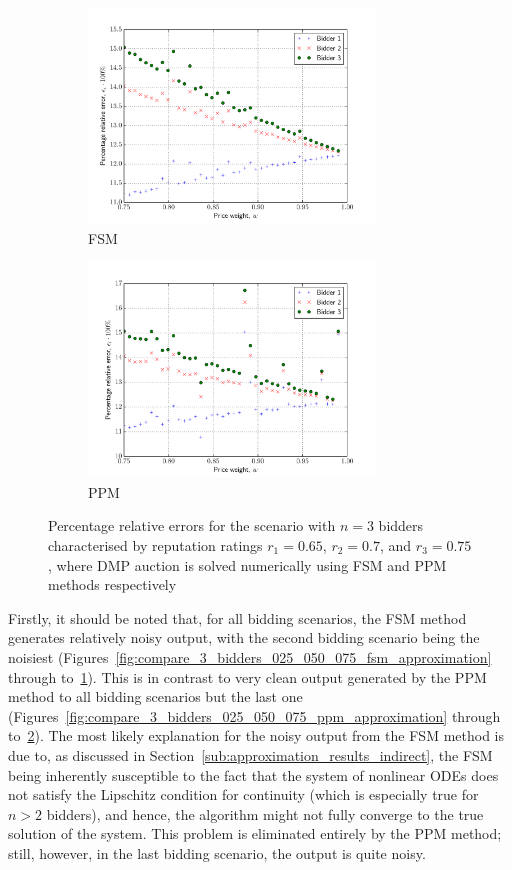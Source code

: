 \begin{figure}[p!]
  \begin{subfigure}[b]{0.5\textwidth}
    \includegraphics[width=3in]{Approximation/Figures/compare_3_bidders_065_070_075}
    \caption{FSM}
    \label{fig:compare_3_bidders_065_070_075_fsm_approximation}
  \end{subfigure}
  \begin{subfigure}[b]{0.5\textwidth}
    \includegraphics[width=3in]{Approximation/Figures/compare_3_bidders_065_070_075_ppm}
    \caption{PPM}
    \label{fig:compare_3_bidders_065_070_075_ppm_approximation}
  \end{subfigure}
  \caption{Percentage relative errors for the scenario with $n=3$ bidders characterised by reputation ratings $r_1=0.65$, $r_2=0.7$, and $r_3=0.75$, where DMP auction is solved numerically using FSM and PPM methods respectively}
  \label{fig:compare_3_bidders_065_070_075_approximation}
\end{figure}

Firstly, it should be noted that, for all bidding scenarios, the FSM method generates relatively noisy output, with the second bidding scenario being the noisiest (Figures~\ref{fig:compare_3_bidders_025_050_075_fsm_approximation} through to~\ref{fig:compare_3_bidders_065_070_075_fsm_approximation}). This is in contrast to very clean output generated by the PPM method to all bidding scenarios but the last one (Figures~\ref{fig:compare_3_bidders_025_050_075_ppm_approximation} through to~\ref{fig:compare_3_bidders_065_070_075_ppm_approximation}). The most likely explanation for the noisy output from the FSM method is due to, as discussed in Section~\ref{sub:approximation_results_indirect}, the FSM being inherently susceptible to the fact that the system of nonlinear ODEs does not satisfy the Lipschitz condition for continuity (which is especially true for $n>2$ bidders), and hence, the algorithm might not fully converge to the true solution of the system. This problem is eliminated entirely by the PPM method; still, however, in the last bidding scenario, the output is quite noisy.

